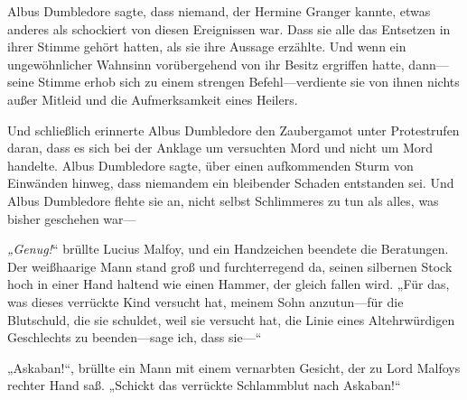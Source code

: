 Albus Dumbledore sagte, dass niemand, der Hermine Granger kannte, etwas anderes als schockiert von diesen Ereignissen war. Dass sie alle das Entsetzen in ihrer Stimme gehört hatten, als sie ihre Aussage erzählte. Und wenn ein ungewöhnlicher Wahnsinn vorübergehend von ihr Besitz ergriffen hatte, dann—seine Stimme erhob sich zu einem strengen Befehl—verdiente sie von ihnen nichts außer Mitleid und die Aufmerksamkeit eines Heilers.

Und schließlich erinnerte Albus Dumbledore den Zaubergamot unter Protestrufen daran, dass es sich bei der Anklage um versuchten Mord und nicht um Mord handelte. Albus Dumbledore sagte, über einen aufkommenden Sturm von Einwänden hinweg, dass niemandem ein bleibender Schaden entstanden sei. Und Albus Dumbledore flehte sie an, nicht selbst Schlimmeres zu tun als alles, was bisher geschehen war—

\emph{„Genug!}“ brüllte Lucius Malfoy, und ein Handzeichen beendete die Beratungen. Der weißhaarige Mann stand groß und furchterregend da, seinen silbernen Stock hoch in einer Hand haltend wie einen Hammer, der gleich fallen wird. „Für das, was dieses verrückte Kind versucht hat, meinem Sohn anzutun—für die Blutschuld, die sie schuldet, weil sie versucht hat, die Linie eines Altehrwürdigen Geschlechts zu beenden—sage ich, dass sie—“

„Askaban!“, brüllte ein Mann mit einem vernarbten Gesicht, der zu Lord Malfoys rechter Hand saß. „Schickt das verrückte Schlammblut nach Askaban!“

